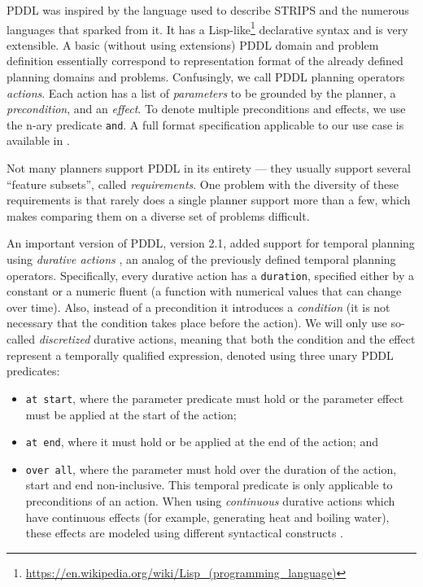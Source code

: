 PDDL was inspired by the language used to describe STRIPS \citep{Fikes1971}
and the numerous languages that sparked from it.
It has a Lisp-like\footnote{\url{https://en.wikipedia.org/wiki/Lisp_(programming_language)}}
declarative syntax and is very extensible.
A basic (without using extensions) PDDL domain and problem definition essentially correspond to representation format of the already defined planning domains and problems. Confusingly, we call PDDL planning operators \textit{actions}.
Each action has a list of \textit{parameters} to be grounded by the planner,
a \textit{precondition}, and an \textit{effect}. To denote multiple
preconditions and effects, we use the n-ary predicate \texttt{and}.
A full format specification applicable to our use case is available in \citet[Appendix A]{Fox2003}.

Not many planners support PDDL in its entirety --- they usually support 
several ``feature subsets'', called \textit{requirements}.
One problem with the diversity of these requirements is that rarely does
a single planner support more than a few, which makes comparing them on a diverse
set of problems difficult.

An important version of PDDL, version 2.1, added support for temporal
planning using \textit{durative actions} \citep[Section~5]{Fox2003},
an analog of the previously defined temporal planning operators.
Specifically, every durative action has a \texttt{duration}, specified
either by a constant or a numeric fluent (a function with numerical values that
can change over time). Also, instead of a precondition it introduces a \textit{condition} (it is not necessary that the condition takes place before the action).
We will only use so-called \textit{discretized} durative actions, meaning that both the condition and the effect represent a temporally qualified expression,
denoted using three unary PDDL predicates:
\begin{itemize}
\item \texttt{at start}, where the parameter predicate must hold or the parameter effect must be applied at the start of the action;
\item \texttt{at end}, where it must hold or be applied at the end of the action; and
\item \texttt{over all}, where the parameter must hold over the duration of the action, start and end non-inclusive. This temporal predicate is only applicable to preconditions of an action. When using \textit{continuous} durative actions which have continuous effects (for example, generating heat and boiling water), these effects are modeled
using different syntactical constructs \citep[Section~5.3]{Fox2003}.
\end{itemize}

